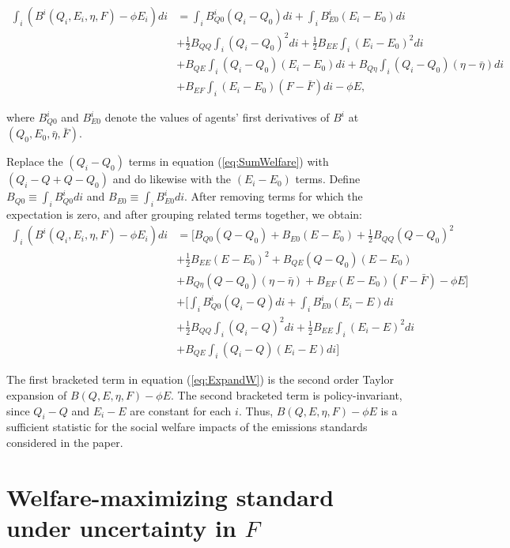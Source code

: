 \documentclass[12pt]{article}
\begin{document}
\begin{align}
\int_i (B^i(Q_i,E_i,\eta,F)-\phi E_i)di &= \int_i B_{Q0}^i(Q_i-Q_0)di + \int_i B_{E0}^i(E_i-E_0)di \nonumber \\
&+ \frac{1}{2}B_{QQ}\int_i (Q_i-Q_0)^2di + \frac{1}{2}B_{EE}\int_i (E_i-E_0)^2di \nonumber \\
&+ B_{QE}\int_i (Q_i-Q_0)(E_i-E_0)di + B_{Q\eta}\int_i(Q_i-Q_0)(\eta-\bar{\eta})di \nonumber \\
&+ B_{EF}\int_i (E_i-E_0)(F-\bar{F})di - \phi E, \label{eq:SumWelfare}
\end{align}

where $B_{Q0}^i$ and $B_{E0}^i$ denote the values of agents' first derivatives of $B^i$ at $(Q_0,E_0,\bar{\eta},\bar{F})$.

Replace the $(Q_i-Q_0)$ terms in equation (\ref{eq:SumWelfare}) with $(Q_i-Q+Q-Q_0)$ and do likewise with the $(E_i-E_0)$ terms. Define $B_{Q0}\equiv\int_iB_{Q0}^idi$ and $B_{E0}\equiv\int_iB_{E0}^idi$. After removing terms for which the expectation is zero, and after grouping related terms together, we obtain:
\begin{align}
\int_i (B^i(Q_i,E_i,\eta,F)-\phi E_i)di &= [B_{Q0}(Q-Q_0)+B_{E0}(E-E_0)+\frac{1}{2}B_{QQ}(Q-Q_0)^2 \nonumber \\
&+\frac{1}{2}B_{EE}(E-E_0)^2 + B_{QE}(Q-Q_0)(E-E_0) \nonumber \\
&+ B_{Q\eta}(Q-Q_0)(\eta-\bar{\eta}) + B_{EF}(E-E_0)(F-\bar{F}) - \phi E] \nonumber \\
&+[\int_i B_{Q0}^i(Q_i-Q)di +\int_i B_{E0}^i(E_i-E)di \nonumber \\
&+ \frac{1}{2}B_{QQ}\int_i (Q_i-Q)^2di + \frac{1}{2}B_{EE}\int_i (E_i-E)^2di \nonumber \\
&+ B_{QE}\int_i (Q_i-Q)(E_i-E)di] \label{eq:ExpandW}
\end{align}

The first bracketed term in equation (\ref{eq:ExpandW}) is the second order Taylor expansion of $B(Q,E,\eta,F)-\phi E$. The second bracketed term is policy-invariant, since $Q_i-Q$ and $E_i-E$ are constant for each $i$. Thus, $B(Q,E,\eta,F)-\phi E$ is a sufficient statistic for the social welfare impacts of the emissions standards considered in the paper.




\section{Welfare-maximizing standard under uncertainty in $F$} \label{appx:Funcert}
\end{document}
